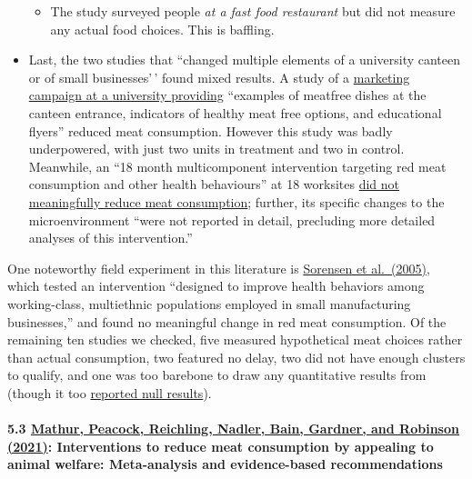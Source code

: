 \documentclass[
  letterpaper,
  DIV=11,
  numbers=noendperiod]{scrartcl}
\let\oldparagraph\paragraph
\renewcommand{\paragraph}[1]{\oldparagraph{#1}\mbox{}}
\providecommand{\tightlist}{%
  \setlength{\itemsep}{0pt}\setlength{\parskip}{0pt}}\usepackage{longtable,booktabs,array}
\begin{document}
\begin{itemize}
  \begin{itemize}
  \tightlist
  \item
    The study surveyed people \emph{at a fast food restaurant} but did
    not measure any actual food choices. This is baffling.
  \end{itemize}
\item
  Last, the two studies that ``changed multiple elements of a university
  canteen or of small businesses'\,' found mixed results. A study of a
  \href{https://pubmed.ncbi.nlm.nih.gov/23409862/}{marketing campaign at
  a university providing} ``examples of meat­free dishes at the canteen
  entrance, indicators of healthy meat­ free options, and educational
  flyers'' reduced meat consumption. However this study was badly
  underpowered, with just two units in treatment and two in control.
  Meanwhile, an ``18 ­month multicomponent intervention targeting red
  meat consumption and other health behaviours'' at 18 worksites
  \href{https://www.ncbi.nlm.nih.gov/pmc/articles/PMC1449340/}{did not
  meaningfully reduce meat consumption}; further, its specific changes
  to the microenvironment ``were not reported in detail, precluding more
  detailed analyses of this intervention.''
\end{itemize}

One noteworthy field experiment in this literature is
\href{https://ncbi.nlm.nih.gov/pmc/articles/PMC1449371/}{Sorensen et
al.~(2005)}, which tested an intervention ``designed to improve health
behaviors among working-class, multiethnic populations employed in small
manufacturing businesses,'' and found no meaningful change in red meat
consumption. Of the remaining ten studies we checked, five measured
hypothetical meat choices rather than actual consumption, two featured
no delay, two did not have enough clusters to qualify, and one was too
barebone to draw any quantitative results from (though it too
\href{https://www.environment.admin.cam.ac.uk/files/report_summary_-_georgia_stewart.pdf}{reported
null results}).

\paragraph{\texorpdfstring{5.3
\href{https://www.sciencedirect.com/science/article/pii/S0195666321001847}{Mathur,
Peacock, Reichling, Nadler, Bain, Gardner, and Robinson (2021)}:
Interventions to reduce meat consumption by appealing to animal welfare:
Meta-analysis and evidence-based
recommendations}{5.3 Mathur, Peacock, Reichling, Nadler, Bain, Gardner, and Robinson (2021): Interventions to reduce meat consumption by appealing to animal welfare: Meta-analysis and evidence-based recommendations}}\label{mathur-peacock-reichling-nadler-bain-gardner-and-robinson-2021-interventions-to-reduce-meat-consumption-by-appealing-to-animal-welfare-meta-analysis-and-evidence-based-recommendations}
\end{document}

